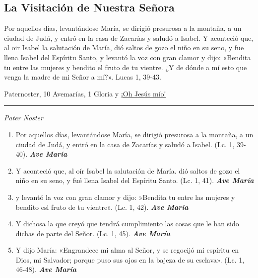 \documentclass[a4paper,11pt, oneside]{report}
\begin{document}
{  \subsection*{La Visitación de Nuestra Señora}
  {
    Por aquellos días, levantándose María, se dirigió presurosa a la montaña, a un ciudad de Judá, y entró en la casa de Zacarías y saludó a Isabel.
    Y aconteció que, al oir Isabel la salutación de María, dió saltos de gozo el niño en su seno, y fue llena Isabel del Espíritu Santo, y levantó la voz con gran
    clamor y dijo: «Bendita tu entre las mujeres y bendito el fruto de tu vientre. ¿Y de dónde a mí esto que venga la madre de mi Señor a mí?». 
    Lucas 1, 39-43.
    
     Paternoster, 10 Avemarías, 1 Gloria y \hyperlink{finalVisitacion}{¡Oh Jesús mío!}

    \medskip

    \begin{center}\rule{1\linewidth}{\linethickness}\end{center}

    \medskip
    \textit{Pater Noster} 

    \begin{enumerate}
      \item Por aquellos días, levantándose María, se dirigió presurosa a la montaña, a un ciudad de Judá, y entró en la casa
      de Zacarías y saludó a Isabel. (Lc. 1, 39-40). \textbf{\textit{Ave María}}

      \item Y aconteció que, al oír Isabel la salutación de María. dió saltos de gozo el niño en su seno, y fué llena Isabel del Espíritu Santo. (Lc. 1, 41). \textbf{\textit{Ave María}}

      \item y levantó la voz con gran clamor y dijo: »Bendita tu entre las mujeres y bendito esl fruto de tu vientre». (Lc. 1, 42). \textbf{\textit{Ave María}}

      \item Y dichosa la que creyó que tendrá cumplimiento las cosas que le han sido dichas de parte del Señor. (Lc. 1, 45). \textbf{\textit{Ave María}}

      \item Y dijo María: «Engrandece mi alma al Señor, y se regocijó mi espíritu en Dios, mi Salvador;
      porque puso sus ojos en la bajeza de su esclava». (Lc. 1, 46-48). \textbf{\textit{Ave María}}


\end{enumerate}}}
\end{document}
